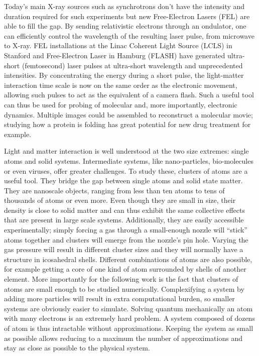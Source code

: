 Today's main X-ray sources such as synchrotrons don't have the intensity and
duration required for such experiments but new Free-Electron Lasers (FEL) are
able to fill the gap. By sending relativistic electrons through an ondulator,
one can efficiently control the wavelength of the resulting laser pulse, from
microwave to X-ray\cite{Ackermann2007a}. FEL installations at the Linac
Coherent Light Source (LCLS) in Stanford and Free-Electron Laser in Hamburg
(FLASH) have generated ultra-short (femtosecond) laser pulses at ultra-short
wavelength and unprecedented intensities. By concentrating the energy during a
short pulse, the light-matter interaction time scale is now on the same order
as the electronic movement, allowing such pulses to act as the equivalent of a
camera flash. Such a useful tool can thus be used for probing of molecular
and, more importantly, electronic dynamics\cite{Chapman2011}. Multiple
images could be assembled to reconstruct a molecular movie; studying how a
protein is folding has great potential for new drug treatment for
example\citeneeded.

Light and matter interaction is well understood at the two size extremes:
single atoms and solid systems. Intermediate systems, like nano-particles,
bio-molecules or even viruses\cite{Seibert2011}, offer greater challenges. To
study these, clusters of atoms are a useful tool. They bridge the gap between
single atoms and solid state matter. They are nanoscale objects, ranging from
less than ten atoms to tens of thousands of atoms or even more. Even though
they are small in size, their density is close to solid matter and can thus
exhibit the same collective effects that are present in large scale
systems\cite{Reinhard2004}. Additionally, they are easily accessible
experimentally; simply forcing a gas through a small-enough nozzle will
``stick'' atoms together and clusters will emerge from the nozzle's pin
hole. Varying the gas pressure will result in different cluster sizes
and they will normally have a structure in icosahedral
shells\cite{Reinhard2004}.
Different combinations of atoms are also possible, for example getting a core of
one kind of atom surrounded by shells of another element. More importantly for
the following work is the fact that clusters of atoms are small enough to be
studied numerically. Complexifying a system by adding more particles will
result in extra computational burden, so smaller systems are obviously easier
to simulate. Solving quantum mechanically an atom with many electrons is an
extremely hard problem. A system composed of dozens of atom is thus intractable
without approximations. Keeping the system as small as possible allows
reducing to a maximum the number of approximations and stay as close as possible
to the physical system.

